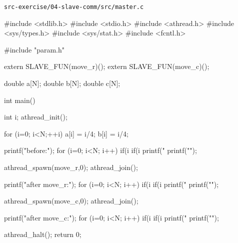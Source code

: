 \verb`src-exercise/04-slave-comm/src/master.c`
\begin{code}
#include <stdlib.h>
#include <stdio.h>
#include <athread.h>
#include <sys/types.h>
#include <sys/stat.h>
#include <fcntl.h>

#include "param.h"

extern SLAVE_FUN(move_r)();
extern SLAVE_FUN(move_c)();

double a[N];
double b[N];
double c[N];

int main() {
  int i;
  athread_init();

  for (i=0; i<N;++i){
    a[i] = i/4;
    b[i] = i/4;
  }

  printf("before:");
  for (i=0; i<N; i++){
    if(i%
    if(i%
    printf("%
  }
  printf("\n");

  athread_spawn(move_r,0);
  athread_join();

  printf("after move_r:");
  for (i=0; i<N; i++){
    if(i%
    if(i%
    printf("%
  }
  printf("\n");

  athread_spawn(move_c,0);
  athread_join();

  printf("after move_c:");
  for (i=0; i<N; i++){
    if(i%
    if(i%
    printf("%
  }
  printf("\n");

  athread_halt();
  return 0;
}

\end{code}

